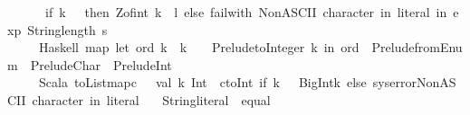 \begin{isabellebody}
\ \ \ \ \ \ if\ k\ {\isacharless}{\kern0pt}\ {}{}{}\ then\ Z{\isachardot}{\kern0pt}of{\isacharprime}{\kern0pt}{\isacharunderscore}{\kern0pt}int\ k\ {\isacharcolon}{\kern0pt}{\isacharcolon}{\kern0pt}\ l\ else\ failwith\ {\isachardoublequote}{\kern0pt}Non{\isacharminus}{\kern0pt}ASCII\ character\ in\ literal{\isachardoublequote}{\kern0pt}{\isacharparenright}{\kern0pt}\ in\ exp\ {\isacharparenleft}{\kern0pt}String{\isachardot}{\kern0pt}length\ s\ {\isacharminus}{\kern0pt}\ {}{\isacharparenright}{\kern0pt}\ {\isacharbrackleft}{\kern0pt}{\isacharbrackright}{\kern0pt}{\isacharparenright}{\kern0pt}{\isachardoublequoteclose}\isanewline
\ \ \ \ \ {\isacharparenleft}{\kern0pt}Haskell{\isacharparenright}{\kern0pt}\ {\isachardoublequoteopen}map{\isacharslash}{\kern0pt}\ {\isacharparenleft}{\kern0pt}let\ ord\ k\ {\isacharbar}{\kern0pt}\ {\isacharparenleft}{\kern0pt}k\ {\isacharless}{\kern0pt}\ {}{}{}{\isacharparenright}{\kern0pt}\ {\isacharequal}{\kern0pt}\ Prelude{\isachardot}{\kern0pt}toInteger\ k\ in\ ord\ {\isachardot}{\kern0pt}\ {\isacharparenleft}{\kern0pt}Prelude{\isachardot}{\kern0pt}fromEnum\ {\isacharcolon}{\kern0pt}{\isacharcolon}{\kern0pt}\ Prelude{\isachardot}{\kern0pt}Char\ {\isacharminus}{\kern0pt}{\isachargreater}{\kern0pt}\ Prelude{\isachardot}{\kern0pt}Int{\isacharparenright}{\kern0pt}{\isacharparenright}{\kern0pt}{\isachardoublequoteclose}\isanewline
\ \ \ \ \ {\isacharparenleft}{\kern0pt}Scala{\isacharparenright}{\kern0pt}\ {\isachardoublequoteopen}{\isacharbang}{\kern0pt}{\isacharparenleft}{\kern0pt}{\isacharunderscore}{\kern0pt}{\isachardot}{\kern0pt}toList{\isachardot}{\kern0pt}map{\isacharparenleft}{\kern0pt}c\ {\isacharequal}{\kern0pt}{\isachargreater}{\kern0pt}\ {\isacharbraceleft}{\kern0pt}\ val\ k{\isacharcolon}{\kern0pt}\ Int\ {\isacharequal}{\kern0pt}\ c{\isachardot}{\kern0pt}toInt{\isacharsemicolon}{\kern0pt}\ if\ {\isacharparenleft}{\kern0pt}k\ {\isacharless}{\kern0pt}\ {}{}{}{\isacharparenright}{\kern0pt}\ BigInt{\isacharparenleft}{\kern0pt}k{\isacharparenright}{\kern0pt}\ else\ sys{\isachardot}{\kern0pt}error{\isacharparenleft}{\kern0pt}{\isachardoublequote}{\kern0pt}Non{\isacharminus}{\kern0pt}ASCII\ character\ in\ literal{\isachardoublequote}{\kern0pt}{\isacharparenright}{\kern0pt}\ {\isacharbraceright}{\kern0pt}{\isacharparenright}{\kern0pt}{\isacharparenright}{\kern0pt}{\isachardoublequoteclose}\isanewline
{\isacharbar}{\kern0pt}\ \ String{\isachardot}{\kern0pt}literal\ {\isacharcolon}{\kern0pt}{\isacharcolon}{\kern0pt}\ equal\ {\isasymrightharpoonup}\isanewline

\end{isabellebody}
